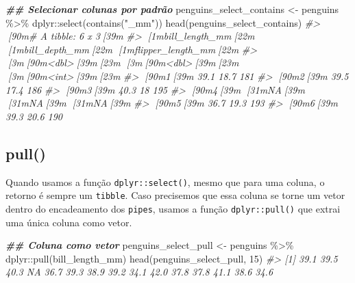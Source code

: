 \documentclass[
]{book}
\newenvironment{Shaded}{\begin{snugshade}}{\end{snugshade}}
\newcommand{\CommentTok}[1]{\textcolor[rgb]{0.37,0.37,0.37}{\textit{#1}}}
\newcommand{\DecValTok}[1]{\textcolor[rgb]{0.06,0.06,0.06}{#1}}
\newcommand{\DocumentationTok}[1]{\textcolor[rgb]{0.37,0.37,0.37}{\textbf{\textit{#1}}}}
\newcommand{\FunctionTok}[1]{\textcolor[rgb]{0,0,0}{#1}}
\newcommand{\NormalTok}[1]{#1}
\newcommand{\OtherTok}[1]{\textcolor[rgb]{0.37,0.37,0.37}{#1}}
\newcommand{\SpecialCharTok}[1]{\textcolor[rgb]{0,0,0}{#1}}
\newcommand{\StringTok}[1]{\textcolor[rgb]{0.5,0.5,0.5}{#1}}
\begin{document}
\begin{Shaded}
\begin{Highlighting}[]
\DocumentationTok{\#\# Selecionar colunas por padrão}
\NormalTok{penguins\_select\_contains }\OtherTok{\textless{}{-}}\NormalTok{ penguins }\SpecialCharTok{\%\textgreater{}\%} 
\NormalTok{  dplyr}\SpecialCharTok{::}\FunctionTok{select}\NormalTok{(}\FunctionTok{contains}\NormalTok{(}\StringTok{"\_mm"}\NormalTok{))}
\FunctionTok{head}\NormalTok{(penguins\_select\_contains)}
\CommentTok{\#\textgreater{} [90m\# A tibble: 6 x 3[39m}
\CommentTok{\#\textgreater{}   [1mbill\_length\_mm[22m [1mbill\_depth\_mm[22m [1mflipper\_length\_mm[22m}
\CommentTok{\#\textgreater{}            [3m[90m\textless{}dbl\textgreater{}[39m[23m         [3m[90m\textless{}dbl\textgreater{}[39m[23m             [3m[90m\textless{}int\textgreater{}[39m[23m}
\CommentTok{\#\textgreater{} [90m1[39m           39.1          18.7               181}
\CommentTok{\#\textgreater{} [90m2[39m           39.5          17.4               186}
\CommentTok{\#\textgreater{} [90m3[39m           40.3          18                 195}
\CommentTok{\#\textgreater{} [90m4[39m           [31mNA[39m            [31mNA[39m                  [31mNA[39m}
\CommentTok{\#\textgreater{} [90m5[39m           36.7          19.3               193}
\CommentTok{\#\textgreater{} [90m6[39m           39.3          20.6               190}
\end{Highlighting}
\end{Shaded}

\hypertarget{pull}{%
\subsection{pull()}\label{pull}}

Quando usamos a função \texttt{dplyr::select()}, mesmo que para uma coluna, o retorno é sempre um \texttt{tibble}. Caso precisemos que essa coluna se torne um vetor dentro do encadeamento dos \texttt{pipes}, usamos a função \texttt{dplyr::pull()} que extrai uma única coluna como vetor.

\begin{Shaded}
\begin{Highlighting}[]
\DocumentationTok{\#\# Coluna como vetor}
\NormalTok{penguins\_select\_pull }\OtherTok{\textless{}{-}}\NormalTok{ penguins }\SpecialCharTok{\%\textgreater{}\%} 
\NormalTok{  dplyr}\SpecialCharTok{::}\FunctionTok{pull}\NormalTok{(bill\_length\_mm)}
\FunctionTok{head}\NormalTok{(penguins\_select\_pull, }\DecValTok{15}\NormalTok{)}
\CommentTok{\#\textgreater{}  [1] 39.1 39.5 40.3   NA 36.7 39.3 38.9 39.2 34.1 42.0 37.8 37.8 41.1 38.6 34.6}
\end{Highlighting}
\end{Shaded}
\end{document}
